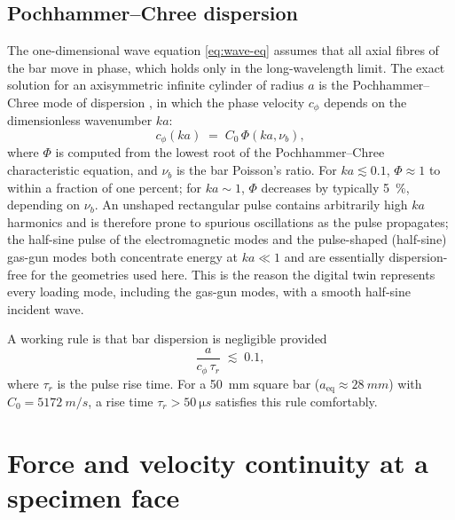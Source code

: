 \documentclass[11pt,a4paper,openany]{book}
\providecommand{\SI}[2]{\qty{#1}{#2}}
\theoremstyle{handbook}
\newcommand{\Cz}{C_0}
\begin{document}
\subsection{Pochhammer--Chree dispersion}\label{sec:dispersion}

The one-dimensional wave equation \eqref{eq:wave-eq} assumes that all axial
fibres of the bar move in phase, which holds only in the long-wavelength
limit. The exact solution for an axisymmetric infinite cylinder of radius
$a$ is the Pochhammer--Chree mode of dispersion \cite{Davies1948,GrahamPC},
in which the phase velocity $c_\phi$ depends on the dimensionless wavenumber
$ka$:
\begin{equation}
  c_\phi(ka) \;=\; \Cz\,\Phi(ka,\nu_b),
\end{equation}
where $\Phi$ is computed from the lowest root of the Pochhammer--Chree
characteristic equation, and $\nu_b$ is the bar Poisson's ratio. For
$ka \lesssim 0.1$, $\Phi \approx 1$ to within a fraction of one percent; for
$ka \sim 1$, $\Phi$ decreases by typically \SI{5}{\percent}, depending on
$\nu_b$. An unshaped rectangular pulse contains arbitrarily high $ka$
harmonics and is therefore prone to spurious oscillations as the pulse
propagates; the half-sine pulse of the electromagnetic modes and the
pulse-shaped (half-sine) gas-gun modes both concentrate energy at
$ka \ll 1$ and are essentially dispersion-free for the geometries used here.
This is the reason the digital twin represents every loading mode, including
the gas-gun modes, with a smooth half-sine incident wave.

A working rule is that bar dispersion is negligible provided
\begin{equation}
  \frac{a}{c_\phi\,\tau_r} \;\lesssim\; 0.1,
  \label{eq:dispersion-rule}
\end{equation}
where $\tau_r$ is the pulse rise time. For a \SI{50}{mm} square bar
($a_{\text{eq}} \approx \SI{28}{mm}$) with $\Cz = \SI{5172}{m/s}$, a rise
time $\tau_r > \SI{50}{\micro s}$ satisfies this rule comfortably.

\section{Force and velocity continuity at a specimen face}
\end{document}

